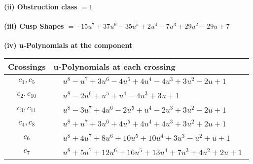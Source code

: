 \documentclass[1p]{elsarticle_modified}
\theoremstyle{definition}
\begin{document}
\flushleft \textbf{(ii) Obstruction class $= 1$}\\~\\
\flushleft \textbf{(iii) Cusp Shapes $= -15 u^7+37 u^6-35 u^5+2 u^4-7 u^3+29 u^2-29 u+7$}\\~\\
\newpage\renewcommand{\arraystretch}{1}
\flushleft \textbf{(iv) u-Polynomials at the component}\newline \\
\begin{tabular}{m{50pt}|m{274pt}}
Crossings & \hspace{64pt}u-Polynomials at each crossing \\
\hline $$\begin{aligned}c_{1},c_{5}\end{aligned}$$&$\begin{aligned}
&u^8- u^7+3 u^6-4 u^5+4 u^4-4 u^3+3 u^2-2 u+1
\end{aligned}$\\
\hline $$\begin{aligned}c_{2},c_{10}\end{aligned}$$&$\begin{aligned}
&u^8-2 u^6+u^5+u^4-4 u^3+3 u+1
\end{aligned}$\\
\hline $$\begin{aligned}c_{3},c_{11}\end{aligned}$$&$\begin{aligned}
&u^8-3 u^7+4 u^6-2 u^5+u^4-2 u^3+3 u^2-2 u+1
\end{aligned}$\\
\hline $$\begin{aligned}c_{4},c_{8}\end{aligned}$$&$\begin{aligned}
&u^8+u^7+3 u^6+4 u^5+4 u^4+4 u^3+3 u^2+2 u+1
\end{aligned}$\\
\hline $$\begin{aligned}c_{6}\end{aligned}$$&$\begin{aligned}
&u^8+4 u^7+8 u^6+10 u^5+10 u^4+3 u^3- u^2+u+1
\end{aligned}$\\
\hline $$\begin{aligned}c_{7}\end{aligned}$$&$\begin{aligned}
&u^8+5 u^7+12 u^6+16 u^5+13 u^4+7 u^3+4 u^2+2 u+1
\end{aligned}$\\

\end{tabular}
\end{document}
